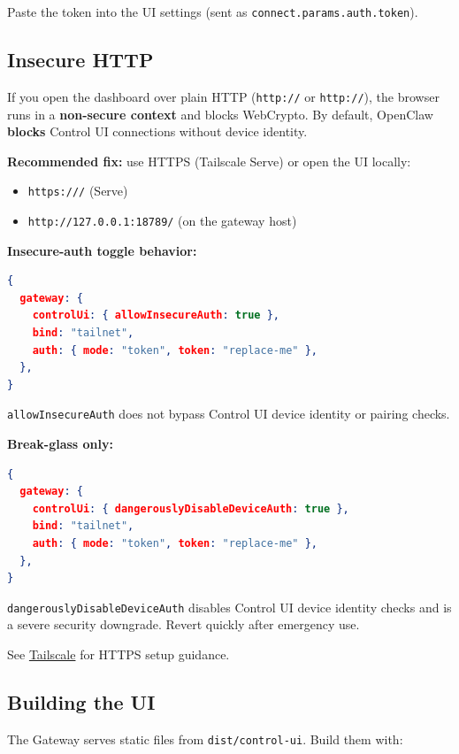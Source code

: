 Paste the token into the UI settings (sent as \texttt{connect.params.auth.token}).

\subsection{Insecure HTTP}


If you open the dashboard over plain HTTP (\texttt{http://} or \texttt{http://}),
the browser runs in a \textbf{non-secure context} and blocks WebCrypto. By default,
OpenClaw \textbf{blocks} Control UI connections without device identity.

\textbf{Recommended fix:} use HTTPS (Tailscale Serve) or open the UI locally:

\begin{itemize}
  \item \texttt{https:///} (Serve)
  \item \texttt{http://127.0.0.1:18789/} (on the gateway host)
\end{itemize}


\textbf{Insecure-auth toggle behavior:}

\begin{lstlisting}[language=json]
{
  gateway: {
    controlUi: { allowInsecureAuth: true },
    bind: "tailnet",
    auth: { mode: "token", token: "replace-me" },
  },
}
\end{lstlisting}


\texttt{allowInsecureAuth} does not bypass Control UI device identity or pairing checks.

\textbf{Break-glass only:}

\begin{lstlisting}[language=json]
{
  gateway: {
    controlUi: { dangerouslyDisableDeviceAuth: true },
    bind: "tailnet",
    auth: { mode: "token", token: "replace-me" },
  },
}
\end{lstlisting}


\texttt{dangerouslyDisableDeviceAuth} disables Control UI device identity checks and is a
severe security downgrade. Revert quickly after emergency use.

See \href{/gateway/tailscale}{Tailscale} for HTTPS setup guidance.

\subsection{Building the UI}


The Gateway serves static files from \texttt{dist/control-ui}. Build them with:

